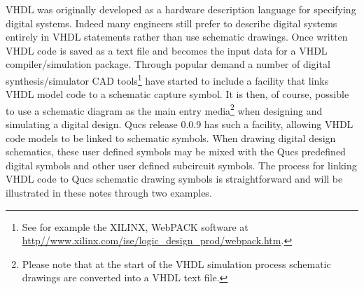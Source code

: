 
VHDL was originally developed as a hardware description language for
specifying digital systems.  Indeed many engineers still prefer to
describe digital systems entirely in VHDL statements rather than use
schematic drawings.  Once written VHDL code is saved as a text file
and becomes the input data for a VHDL compiler/simulation
package. Through popular demand a number of digital
synthesis/simulator CAD tools\footnote{See for example the XILINX,
WebPACK software at
\url{http//www.xilinx.com/ise/logic_design_prod/webpack.htm}. } have
started to include a facility that links VHDL model code to a
schematic capture symbol. It is then, of course, possible to use a
schematic diagram as the main entry media\footnote{Please note that at
the start of the VHDL simulation process schematic drawings are
converted into a VHDL text file. } when designing and simulating a
digital design.  Qucs release 0.0.9 has such a facility, allowing VHDL
code models to be linked to schematic symbols. When drawing digital
design schematics, these user defined symbols may be mixed with the
Qucs predefined digital symbols and other user defined subcircuit
symbols.  The process for linking VHDL code to Qucs schematic drawing
symbols is straightforward and will be illustrated in these notes
through two examples.

